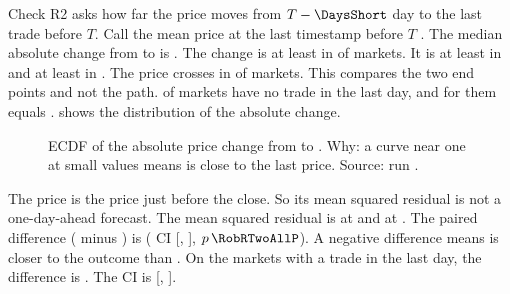 Check R2 asks how far the price moves from $T-\DaysShort$ day to the last trade before $T$.
Call the mean price at the last timestamp before $T$ \pT.
The median absolute change from \pOne{} to \pT{} is \RobRTwoMedianAbsDelta.
The change is at least \DeltaA{} in \RobRTwoShareDeltaAtLeastTen{} of markets.
It is at least \DeltaB{} in \RobRTwoShareDeltaAtLeastTwentyFive{} and at least \DeltaC{} in \RobRTwoShareDeltaAtLeastFifty.
The price crosses \FavoriteLine{} in \RobRTwoShareCrossing{} of markets.
This compares the two end points and not the path.
\RobRTwoShareNoTrade{} of markets have no trade in the last day, and for them \pT{} equals \pOne.
 shows the distribution of the absolute change.

\begin{figure}[H]
\centering
{}
\caption{ECDF of the absolute price change from \pOne{} to \pT. Why: a curve near one at small values means \pOne{} is close to the last price. Source: run \RobustRun.}
\label{fig:r2}
\end{figure}

The price \pT{} is the price just before the close.
So its mean squared residual is not a one-day-ahead forecast.
The mean squared residual is \RobRTwoAllBrierOneDay{} at \pOne{} and \RobRTwoAllBrierAtClose{} at \pT.
The paired difference (\pT{} minus \pOne) is \RobRTwoAllMeanDiff{}
(\CiLevel{} CI [\RobRTwoAllCiLow, \RobRTwoAllCiHigh], $p\,\RobRTwoAllP$).
A negative difference means \pT{} is closer to the outcome than \pOne.
On the \RobRTwoTradedN{} markets with a trade in the last day, the difference is \RobRTwoTradedMeanDiff.
The \CiLevel{} CI is [\RobRTwoTradedCiLow, \RobRTwoTradedCiHigh].
